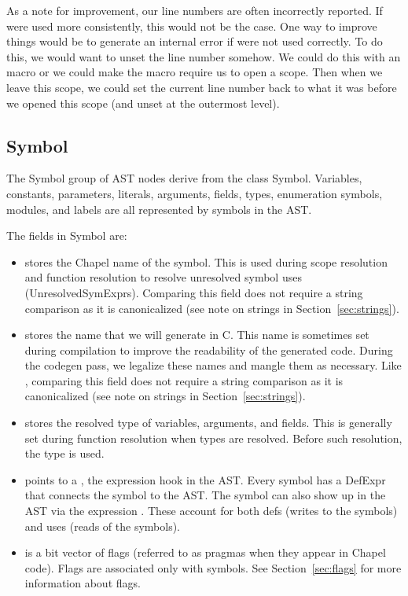 \documentclass[10pt]{article}
\begin{document}
As a note for improvement, our line numbers are often incorrectly
reported.  If  were used more consistently, this would
not be the case.  One way to improve things would be to generate an
internal error if  were not used correctly.  To do
this, we would want to unset the line number somehow.  We could do
this with an  macro or we could make the
 macro require us to open a scope.  Then when we leave
this scope, we could set the current line number back to what it was
before we opened this scope (and unset at the outermost level).

\subsection{Symbol}

The Symbol group of AST nodes derive from the class Symbol.
Variables, constants, parameters, literals, arguments, fields, types,
enumeration symbols, modules, and labels are all represented by
symbols in the AST.

The fields in Symbol are:
\begin{itemize}
\item {} stores the Chapel name of the symbol.
  This is used during scope resolution and function resolution to
  resolve unresolved symbol uses (UnresolvedSymExprs).  Comparing this
  field does not require a string comparison as it is canonicalized
  (see note on strings in Section~\ref{sec:strings}).
\item {} stores the name that we will generate in
  C.  This name is sometimes set during compilation to improve the
  readability of the generated code.  During the codegen pass, we
  legalize these names and mangle them as necessary.  Like , comparing this
  field does not require a string comparison as it is canonicalized
  (see note on strings in Section~\ref{sec:strings}).
\item {} stores the resolved type of variables,
  arguments, and fields.  This is generally set during function
  resolution when types are resolved.  Before such resolution, the
  type  is used.
\item {} points to a , the expression
  hook in the AST.  Every symbol has a DefExpr that connects the
  symbol to the AST.  The symbol can also show up in the AST via the
  expression .  These account for both defs (writes to the
  symbols) and uses (reads of the symbols).
\item {} is a bit vector of flags
  (referred to as pragmas when they appear in Chapel code).  Flags are
  associated only with symbols.  See Section~\ref{sec:flags} for more
  information about flags.
\end{itemize}
\end{document}
